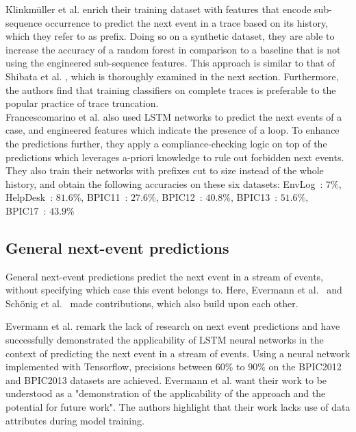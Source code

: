 Klinkmüller et al. enrich their training dataset with features that encode sub-sequence occurrence \cite{klinkmuller2018reliablemonitoring} to predict the next event in a trace based on its history, which they refer to as prefix. Doing so on a synthetic dataset, they are able to increase the accuracy of a random forest in comparison to a baseline that is not using the engineered sub-sequence features. This approach is similar to that of Shibata et al. \cite{shibata2016bipartite}, which is thoroughly examined in the next section. Furthermore, the authors find that training classifiers on complete traces is preferable to the popular practice of trace truncation.\\

Francescomarino et al. also used LSTM networks to predict the next events of a case, and engineered features which indicate the presence of a loop. To enhance the predictions further, they apply a compliance-checking logic on top of the predictions which leverages a-priori knowledge to rule out forbidden next events. They also train their networks with prefixes cut to size instead of the whole history, and obtain the following accuracies on these six datasets: 
EnvLog~\cite{EnvLog}: $7\%$, HelpDesk~\cite{Helpdesk}: $81.6\%$, BPIC11~\cite{BPIC2011}: $27.6\%$, BPIC12~\cite{BPIC2012}: $40.8\%$, BPIC13~\cite{BPIC2013}: $51.6\%$, BPIC17~\cite{BPIC2017}: $43.9\%$

\subsection*{General next-event predictions}
General next-event predictions predict the next event in a stream of events, without specifying which case this event belongs to. Here, Evermann et al.~\cite{evermann2016} and Schönig et al.~\cite{schoenig2018} made contributions, which also build upon each other.

Evermann et al. remark the lack of research on next event predictions and have successfully demonstrated the applicability of LSTM neural networks in the context of predicting the next event in a stream of events. Using a neural network implemented with Tensorflow, precisions between $60\%$ to $90\%$ on the BPIC2012 and BPIC2013 datasets are achieved. Evermann et al. want their work to be understood as a "demonstration of the applicability of the approach and the potential for future work". The authors highlight that their work lacks use of data attributes during model training. 

